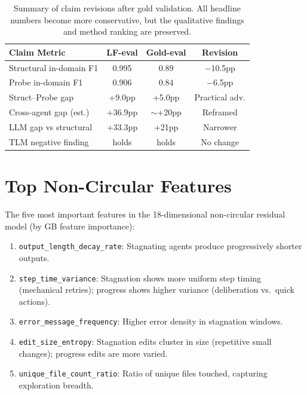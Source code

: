 \documentclass[11pt,a4paper]{article}
\begin{document}
\begin{table}[h]
\centering
\small
\begin{tabular}{lccc}
\toprule
\textbf{Claim Metric} & \textbf{LF-eval} & \textbf{Gold-eval} & \textbf{Revision} \\
\midrule
Structural in-domain F1 & 0.995 & 0.89 & $-$10.5pp \\
Probe in-domain F1 & 0.906 & 0.84 & $-$6.5pp \\
Struct--Probe gap & +9.0pp & +5.0pp & Practical adv. \\
Cross-agent gap (est.) & +36.9pp & $\sim$+20pp & Reframed \\
LLM gap vs structural & +33.3pp & +21pp & Narrower \\
TLM negative finding & holds & holds & No change \\
\bottomrule
\end{tabular}
\caption{Summary of claim revisions after gold validation. All headline numbers become more conservative, but the qualitative findings and method ranking are preserved.}
\label{tab:revision}
\end{table}

\section{Top Non-Circular Features}
\label{app:features}

The five most important features in the 18-dimensional non-circular residual model (by GB feature importance):
\begin{enumerate}[nosep]
\item \texttt{output\_length\_decay\_rate}: Stagnating agents produce progressively shorter outputs.
\item \texttt{step\_time\_variance}: Stagnation shows more uniform step timing (mechanical retries); progress shows higher variance (deliberation vs.\ quick actions).
\item \texttt{error\_message\_frequency}: Higher error density in stagnation windows.
\item \texttt{edit\_size\_entropy}: Stagnation edits cluster in size (repetitive small changes); progress edits are more varied.
\item \texttt{unique\_file\_count\_ratio}: Ratio of unique files touched, capturing exploration breadth.
\end{enumerate}
\end{document}
